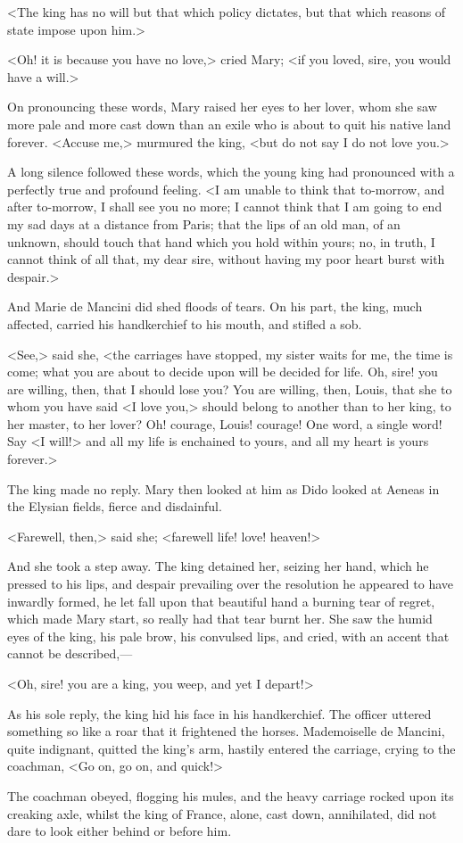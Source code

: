 <The king has no will but that which policy dictates, but that which reasons of state impose upon him.>

<Oh! it is because you have no love,> cried Mary; <if you loved, sire, you would have a will.>

On pronouncing these words, Mary raised her eyes to her lover, whom she saw more pale and more cast down than an exile who is about to quit his native land forever. <Accuse me,> murmured the king, <but do not say I do not love you.>

A long silence followed these words, which the young king had pronounced with a perfectly true and profound feeling. <I am unable to think that to-morrow, and after to-morrow, I shall see you no more; I cannot think that I am going to end my sad days at a distance from Paris; that the lips of an old man, of an unknown, should touch that hand which you hold within yours; no, in truth, I cannot think of all that, my dear sire, without having my poor heart burst with despair.>

And Marie de Mancini did shed floods of tears. On his part, the king, much affected, carried his handkerchief to his mouth, and stifled a sob.

<See,> said she, <the carriages have stopped, my sister waits for me, the time is come; what you are about to decide upon will be decided for life. Oh, sire! you are willing, then, that I should lose you? You are willing, then, Louis, that she to whom you have said <I love you,> should belong to another than to her king, to her master, to her lover? Oh! courage, Louis! courage! One word, a single word! Say <I will!> and all my life is enchained to yours, and all my heart is yours forever.>

The king made no reply. Mary then looked at him as Dido looked at Aeneas in the Elysian fields, fierce and disdainful.

<Farewell, then,> said she; <farewell life! love! heaven!>

And she took a step away. The king detained her, seizing her hand, which he pressed to his lips, and despair prevailing over the resolution he appeared to have inwardly formed, he let fall upon that beautiful hand a burning tear of regret, which made Mary start, so really had that tear burnt her. She saw the humid eyes of the king, his pale brow, his convulsed lips, and cried, with an accent that cannot be described,—

<Oh, sire! you are a king, you weep, and yet I depart!>

As his sole reply, the king hid his face in his handkerchief. The officer uttered something so like a roar that it frightened the horses. Mademoiselle de Mancini, quite indignant, quitted the king's arm, hastily entered the carriage, crying to the coachman, <Go on, go on, and quick!>

The coachman obeyed, flogging his mules, and the heavy carriage rocked upon its creaking axle, whilst the king of France, alone, cast down, annihilated, did not dare to look either behind or before him. 